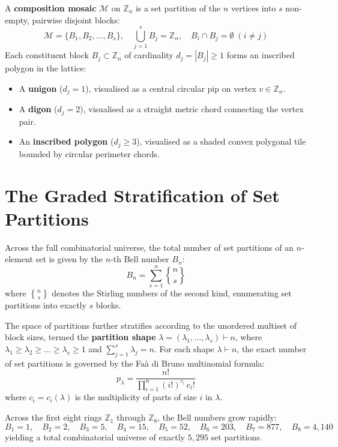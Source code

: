 A \textbf{composition mosaic} $\mathcal{M}$ on $\mathbb{Z}_n$ is a set partition of the $n$ vertices into $s$ non-empty, pairwise disjoint blocks:
\begin{equation}
\mathcal{M} = \{B_1, B_2, \dots, B_s\}, \quad \bigcup_{j=1}^s B_j = \mathbb{Z}_n, \quad B_i \cap B_j = \emptyset \; (i \neq j)
\end{equation}
Each constituent block $B_j \subset \mathbb{Z}_n$ of cardinality $d_j = |B_j| \ge 1$ forms an inscribed polygon in the lattice:
\begin{itemize}
    \item A \textbf{unigon} ($d_j = 1$), visualised as a central circular pip on vertex $v \in \mathbb{Z}_n$.
    \item A \textbf{digon} ($d_j = 2$), visualised as a straight metric chord connecting the vertex pair.
    \item An \textbf{inscribed polygon} ($d_j \ge 3$), visualised as a shaded convex polygonal tile bounded by circular perimeter chords.
\end{itemize}

\section{The Graded Stratification of Set Partitions}

Across the full combinatorial universe, the total number of set partitions of an $n$-element set is given by the $n$-th Bell number $B_n$:
\begin{equation}
B_n = \sum_{s=1}^n \genfrac{\{}{\}}{0pt}{}{n}{s}
\end{equation}
where $\genfrac{\{}{\}}{0pt}{}{n}{s}$ denotes the Stirling numbers of the second kind, enumerating set partitions into exactly $s$ blocks. 

The space of partitions further stratifies according to the unordered multiset of block sizes, termed the \textbf{partition shape} $\lambda = (\lambda_1, \dots, \lambda_s) \vdash n$, where $\lambda_1 \ge \lambda_2 \ge \dots \ge \lambda_s \ge 1$ and $\sum_{j=1}^s \lambda_j = n$. For each shape $\lambda \vdash n$, the exact number of set partitions is governed by the Fa\`a di Bruno multinomial formula:
\begin{equation}
p_\lambda = \frac{n!}{\prod_{i=1}^n (i!)^{c_i} \, c_i!}
\end{equation}
where $c_i = c_i(\lambda)$ is the multiplicity of parts of size $i$ in $\lambda$.

Across the first eight rings $\mathbb{Z}_1$ through $\mathbb{Z}_8$, the Bell numbers grow rapidly:
\begin{equation*}
B_1 = 1, \quad B_2 = 2, \quad B_3 = 5, \quad B_4 = 15, \quad B_5 = 52, \quad B_6 = 203, \quad B_7 = 877, \quad B_8 = 4{,}140
\end{equation*}
yielding a total combinatorial universe of exactly $5{,}295$ set partitions.

